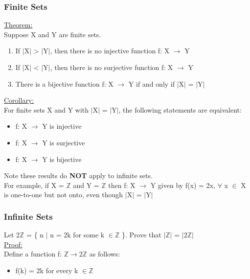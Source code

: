\documentclass{article}
\begin{document}
\subsubsection{Finite Sets}

\underline{Theorem:} \\

Suppose X and Y are finite sets.

\begin{enumerate}
\item If $|$X$|$ > $|$Y$|$, then there is no injective function f: X $\longrightarrow$ Y 
\item If $|$X$|$ < $|$Y$|$, then there is no surjective function f: X $\longrightarrow$ Y
\item There is a bijective function f: X $\longrightarrow$ Y if and only if $|$X$|$ = $|$Y$|$
\end{enumerate}

\underline{Corollary:} \\

For finite sets X and Y with $|$X$|$ = $|$Y$|$, the following statements are equivalent:
\begin{itemize}
\item f: X $\longrightarrow$ Y is injective 
\item f: X $\longrightarrow$ Y is surjective 
\item f: X $\longrightarrow$ Y is bijective 
\end{itemize}

Note these results do \textbf{NOT} apply to infinite sets. \\

For example, if X = $\mathbb{Z}$ and Y = $\mathbb{Z}$ then f: X $\longrightarrow$ Y given by f(x) = 2x, $\forall$ x $\in$ X is one-to-one but not onto, even though $|$X$|$ = $|$Y$|$

\subsubsection{Infinite Sets}

Let 2$\mathbb{Z}$ = \{ n $|$ n = 2k for some k $\in \mathbb{Z}$ \}. Prove that $|\mathbb{Z}|$ = $|2\mathbb{Z}|$  \\

\underline{Proof:} \\

Define a function f: $\mathbb{Z} \longrightarrow 2\mathbb{Z}$ as follows:
\begin{itemize}
\item f(k) = 2k for every k $\in \mathbb{Z}$
\end{itemize}
\end{document}
